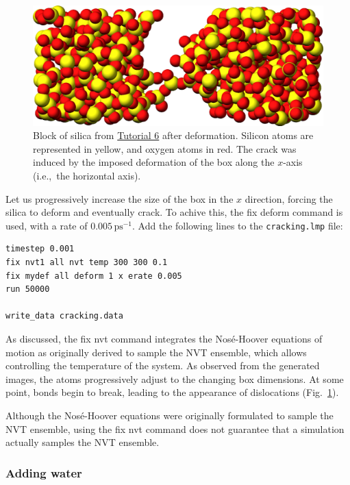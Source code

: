 \documentclass[9pt,tutorial]{livecoms}
\newcommand{\lmpcmd}[1]{\colorbox{listing}{\textcolor{command}{\small{#1}}}} %
\newcommand{\flecmd}[1]{\textcolor{command}{\texttt{#1}}} %
\begin{document}
\begin{figure}
\centering
\includegraphics[width=\linewidth]{GCMC-cracked}
\caption{Block of silica from \hyperref[gcmc-silica-label]{Tutorial 6}
after deformation.  Silicon atoms are represented in yellow,
and oxygen atoms in red.  The crack was induced by the
imposed deformation of the box along the $x$-axis (i.e.,~the horizontal axis).}
\label{fig:GCMC-cracked}
\end{figure}
Let us progressively increase the size of the box in the $x$ direction,
forcing the silica to deform and eventually crack.  To achive this,
the \lmpcmd{fix deform} command is used, with a rate
of $0.005\,\text{ps}^{-1}$.  Add the following lines to
the \flecmd{cracking.lmp} file:
\begin{lstlisting}
timestep 0.001
fix nvt1 all nvt temp 300 300 0.1
fix mydef all deform 1 x erate 0.005
run 50000

write_data cracking.data
\end{lstlisting}
{\color{blue}As discussed, the \lmpcmd{fix nvt} command integrates the Nosé-Hoover equations
of motion as originally derived to sample the NVT ensemble, 
which allows controlling the temperature of the system.}
As observed from the generated images, the atoms
progressively adjust to the changing box dimensions.  At some point,
bonds begin to break, leading to the appearance of
dislocations (Fig.~\ref{fig:GCMC-cracked}).

\begin{note}
{\color{blue}Although the Nosé-Hoover equations were originally formulated to sample the
NVT ensemble, using the \lmpcmd{fix nvt} command does not guarantee that
a simulation actually samples the NVT ensemble.}
\end{note}

\subsubsection{Adding water}
\end{document}
